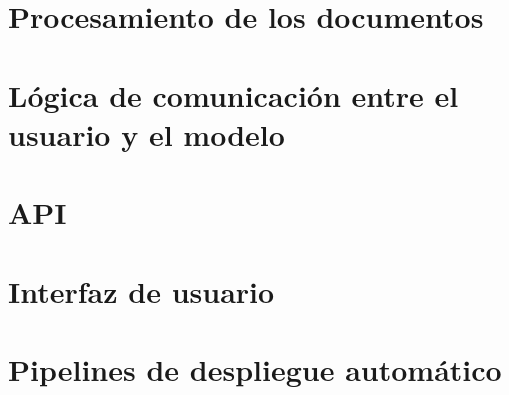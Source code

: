 \section{Procesamiento de los documentos}

\section{Lógica de comunicación entre el usuario y el modelo}

\section{API}

\section{Interfaz de usuario}

\section{Pipelines de despliegue automático}
